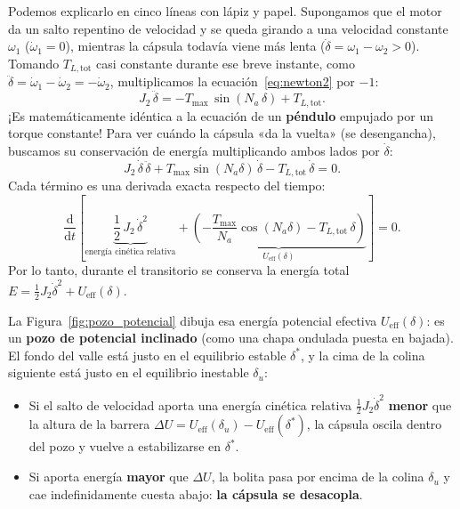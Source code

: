 \documentclass[11pt,a4paper,oneside]{book}
\newcommand{\dd}{\mathrm{d}}
\begin{document}
Podemos explicarlo en cinco líneas con lápiz y papel. Supongamos que el motor
da un salto repentino de velocidad y se queda girando a una velocidad constante
$\omega_1$ ($\dot\omega_1 = 0$), mientras la cápsula todavía viene más lenta
($\dot\delta = \omega_1 - \omega_2 > 0$). Tomando $T_{L,\text{tot}}$ casi
constante durante ese breve instante, como $\ddot\delta = \dot\omega_1 - \dot\omega_2 = -\dot\omega_2$,
multiplicamos la ecuación~\eqref{eq:newton2} por $-1$:
\begin{equation}
  J_2\,\ddot\delta = -T_{\max}\,\sin(N_a\,\delta) + T_{L,\text{tot}}.
  \label{eq:pendulo_acople}
\end{equation}
¡Es matemáticamente idéntica a la ecuación de un \textbf{péndulo} empujado por
un torque constante! Para ver cuándo la cápsula «da la vuelta» (se desengancha),
buscamos su conservación de energía multiplicando ambos lados por $\dot\delta$:
\[
  J_2\,\dot\delta\,\ddot\delta + T_{\max}\sin(N_a\delta)\,\dot\delta - T_{L,\text{tot}}\,\dot\delta = 0.
\]
Cada término es una derivada exacta respecto del tiempo:
\[
  \frac{\dd}{\dd t}\!\left[
    \underbrace{\frac{1}{2}\,J_2\,\dot\delta^2}_{\text{energía cinética relativa}}
    + \underbrace{\left(-\frac{T_{\max}}{N_a}\cos(N_a\delta) - T_{L,\text{tot}}\,\delta\right)}_{U_{\text{eff}}(\delta)}
  \right] = 0.
\]
Por lo tanto, durante el transitorio se conserva la energía total
$E = \frac{1}{2}J_2\dot\delta^2 + U_{\text{eff}}(\delta)$.

La Figura~\ref{fig:pozo_potencial} dibuja esa energía potencial efectiva
$U_{\text{eff}}(\delta)$: es un \textbf{pozo de potencial inclinado} (como una
chapa ondulada puesta en bajada). El fondo del valle está justo en el equilibrio
estable $\delta^\ast$, y la cima de la colina siguiente está justo en el
equilibrio inestable $\delta_u$:
\begin{itemize}
  \item Si el salto de velocidad aporta una energía cinética relativa
        $\frac{1}{2}J_2\dot\delta^2$ \textbf{menor} que la altura de la barrera
        $\Delta U = U_{\text{eff}}(\delta_u) - U_{\text{eff}}(\delta^\ast)$, la
        cápsula oscila dentro del pozo y vuelve a estabilizarse en $\delta^\ast$.
  \item Si aporta energía \textbf{mayor} que $\Delta U$, la bolita pasa por
        encima de la colina $\delta_u$ y cae indefinidamente cuesta abajo:
        \textbf{la cápsula se desacopla}.
\end{itemize}
\end{document}
